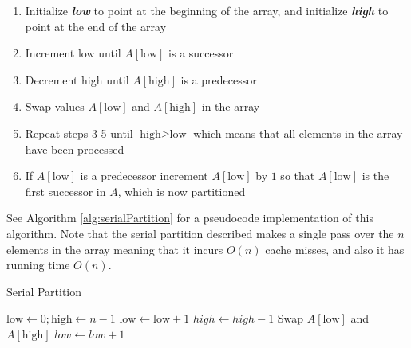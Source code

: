 \documentclass[twocolumn, twoside, 12pt]{article}
\newcommand{\defn}[1]       {{\textit{\textbf{\boldmath #1}}}}
\begin{document}
\begin{enumerate}
	\item{Initialize \defn{low} to point at the beginning of the array, and initialize \defn{high} to point at the end of the array}
	\item{Increment low until $A[\text{low}]$ is a successor}
	\item{Decrement high until $A[\text{high}]$ is a predecessor}
	\item{Swap values $A[\text{low}]$ and $A[\text{high}]$ in the array}
	\item{Repeat steps 3-5 until $\text{high} \geq \text{low}$ which means that all elements in the array have been processed}
	\item{If $A[\text{low}]$ is a predecessor increment $A[\text{low}]$ by $1$ so that $A[\text{low}]$ is the first successor in $A$, which is now partitioned}
\end{enumerate}

See Algorithm \ref{alg:serialPartition} for a pseudocode implementation of this algorithm. Note that the serial partition described makes a single pass over the $n$ elements in the array meaning that it incurs $O(n)$ cache misses, and also it has running time $O(n)$.

\vspace{5mm}
\begin{samepage}
\begin{algorithm}
	\caption{Serial Partition}
	\label{alg:serialPartition}
	\begin{algorithmic}
		\State $\text{low} \gets 0; \text{high} \gets n-1$
				\State $\text{low} \gets \text{low}+1$
			\EndWhile
				\State $high \gets high-1$
			\EndWhile
			\State Swap $A[\text{low}]$ and $A[\text{high}]$
		\EndWhile
			\State $low \gets low+1$
		\EndIf
	\end{algorithmic}	
\end{algorithm}
\end{samepage}
\end{document}
